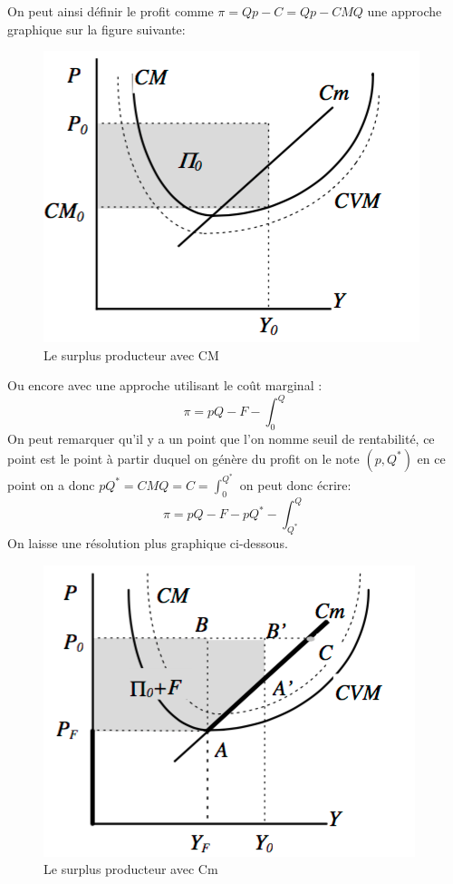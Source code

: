 On peut ainsi définir le profit comme $\pi = Qp - C=Qp - CM Q$ une approche graphique sur la figure suivante:


\begin{figure}[h]
\begin{center}
\includegraphics[scale=0.3]{./img/IM6}
\caption{Le surplus producteur avec CM}
\end{center}
\end{figure}

Ou encore avec une approche utilisant le coût marginal :
$$\pi = pQ - F - \int_0^Q$$ 
On peut remarquer qu'il y a un point que l'on nomme seuil de rentabilité, ce point est le point à partir duquel on génère du profit on le note $(p,Q^*)$ en ce point on a donc $pQ^*=CMQ=C=\int_0^{Q^*}$ on peut donc écrire:
$$\pi = pQ - F -pQ^*- \int_{Q^*}^Q$$ 
On laisse une résolution plus graphique ci-dessous.

\begin{figure}[h]
\begin{center}
\includegraphics[scale=0.3]{./img/IM7}
\caption{Le surplus producteur avec Cm}
\end{center}
\end{figure}